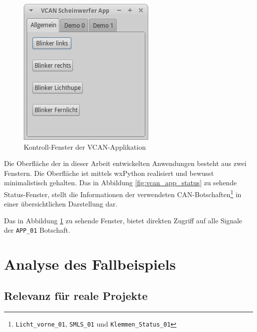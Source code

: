 \documentclass[
  a4paper,					    %
  twoside,
  DIV=calc,     				%
  bibliography=totoc,
  cleardoublepage=empty,
  ngerman,     					%
  final       					%
]{scrbook}
\begin{document}
\begin{figure}[ht]
\centering
\includegraphics[width=0.4  \textwidth]{vcan_app_control}
\caption{Kontroll-Fenster der VCAN-Applikation}
\label{fig:vcan_app_control}
\end{figure}

Die Oberfläche der in dieser Arbeit entwickelten Anwendungen besteht aus zwei Fenstern. Die Oberfläche ist mittels wxPython realisiert und bewusst minimalistisch gehalten. Das in Abbildung \ref{fig:vcan_app_status} zu sehende Status-Fenster, stellt die Informationen der verwendeten CAN-Botschaften\footnote{\texttt{Licht\_vorne\_01}, \texttt{SMLS\_01} und \texttt{Klemmen\_Status\_01}} in einer übersichtlichen Darstellung dar.

Das in Abbildung \ref{fig:vcan_app_control} zu sehende Fenster, bietet direkten Zugriff auf alle Signale der \texttt{APP\_01} Botschaft.















\chapter{Analyse des Fallbeispiels}
\label{sec:Beispiel_Analyse}




\section{Relevanz für reale Projekte}
\label{sec:Relevanz}
% 
\end{document}
